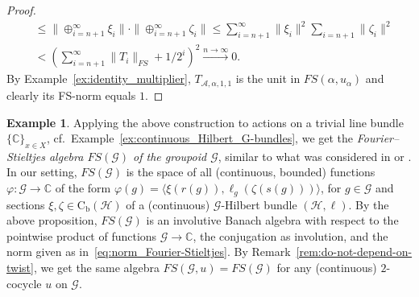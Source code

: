 \documentclass[11 pt, leqno]{amsart}
\numberwithin{equation}{section}
\theoremstyle{plain}
\theoremstyle{definition}
\newtheorem{ex}[thm]{Example}
\newcommand*{\contb}{\mathrm{C_b}}%
\renewcommand{\H}{\mathcal H}
\newcommand{\G}{\mathcal G} %
\newcommand{\EE}{\mathcal E}
\newcommand{\A}{\mathcal A}
\newcommand{\C}{\mathbb C}
\newcommand{\cst}{\ifmmode\mathrm{C}^*\else{$\mathrm{C}^*$}\fi}
\begin{document}
\begin{proof}
\[\begin{split}
    &\leq \|\oplus_{i=n+1}^\infty \xi_i\| \cdot \|\oplus_{i=n+1}^\infty \zeta_i\| \leq \sum_{i=n+1}^\infty \|\xi_i\|^2 \sum_{i=n+1} \|\zeta_i\|^2 \\
        &< \left( \sum_{i=n+1}^\infty \|T_i\|_{FS} +1/2^i\right)^2 \stackrel{n\to \infty}{\longrightarrow} 0. 
\end{split}
\]
By Example~\ref{ex:identity_multiplier}, $T_{\A,\alpha,1,1}$ is the unit in $FS(\alpha,u_{\alpha})$ and clearly its FS-norm equals $1$. 
\end{proof}


\begin{ex}\label{ex:Fourier-Stietjes-algebra-groupoids}
Applying the above construction to actions on a trivial line bundle $\{\C\}_{x\in X}$, cf.\ Example~\ref{ex:continuous_Hilbert_G-bundles}, we get the \emph{Fourier--Stieltjes algebra $FS(\G)$ of the groupoid $\G$}, similar to what was considered in \cite{RamsayWalter} or \cite{Oty}. 
In our setting, $FS(\G)$ is the space of all (continuous, bounded) functions $\varphi\colon \G\to \C$ of the form $\varphi(g) = \langle \xi(r(g)) , \ell_g(\zeta(s(g))) \rangle$, for $g\in \G$ and  
sections $\xi ,\zeta \in \contb (\H)$ of a (continuous) $\G$-Hilbert bundle $(\H,\ell)$. 
By the above proposition, $FS(\G)$ is an involutive Banach algebra with respect to the pointwise product of functions $\G\to \C$, the conjugation as involution, and the norm given as in~\eqref{eq:norm_Fourier-Stieltjes}.
By Remark~\ref{rem:do-not-depend-on-twist}, we get the same algebra $FS(\G,u)=FS(\G)$ for any (continuous) $2$-cocycle $u$ on $\G$.
\end{ex}
\end{document}
